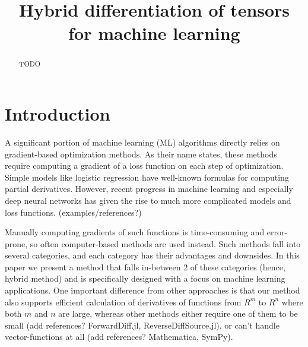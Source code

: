 \documentclass[conference]{IEEEtran}
\begin{document}
\title{Hybrid differentiation of tensors \\ for machine learning}


\author{
\and
{}
\and
{}
}

\maketitle


\begin{abstract}
TODO


\end{abstract}


\IEEEpeerreviewmaketitle


\section{Introduction}

A significant portion of machine learning (ML) algorithms directly relies on gradient-based optimization methods. As their name states, these methods require computing a gradient of a loss function on each step of optimization. Simple models like logistic regression have well-known formulas for computing partial derivatives. However, recent progress in machine learning and especially deep neural networks has given the rise to much more complicated models and loss functions. (examples/references?) 

Manually computing gradients of such functions is time-consuming and error-prone, so often computer-based methods are used instead. Such methods fall into several categories, and each category has their advantages and downsides. In this paper we present a method that falls in-between 2 of these categories (hence, hybrid method) and is specifically designed with a focus on machine learning applications. One important difference from other approaches is that our method also supports efficient calculation of derivatives of functions from $R^m$ to $R^n$ where both $m$ and $n$ are large, whereas other methods either require one of them to be small (add references? ForwardDiff.jl, ReverseDiffSource.jl), or can't handle vector-functions at all (add references? Mathematica, SymPy). 
\end{document}
